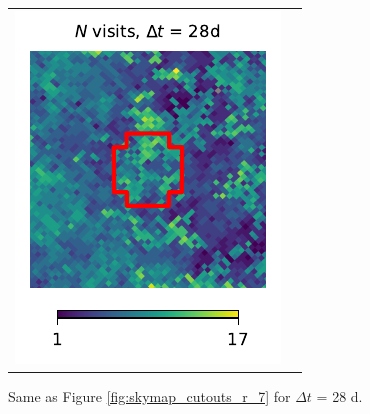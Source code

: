 \documentclass[preprintm,linenumbers]{aastex631}
\begin{document}
\begin{figure}
\begin{tabular}{@{}c@{}c@{}}
				\includegraphics{results/skymaps_cutout/skymaps_cutout_first_year_one_snap_v4_0_10yrs_db_noDD_noTwi_tscale-28_nside-256_doAllTemplateMetrics_reduceCount_r_WFD_noDD_noTwi.pdf} \\
			\end{tabular}
			\caption{
				 Same as Figure \ref{fig:skymap_cutouts_r_7} for $\Delta t$ = 28 d.  
			}
   \label{fig:skymap_cutouts_r_28}
		\end{figure}


  
		

  		

    
	
\end{document}

